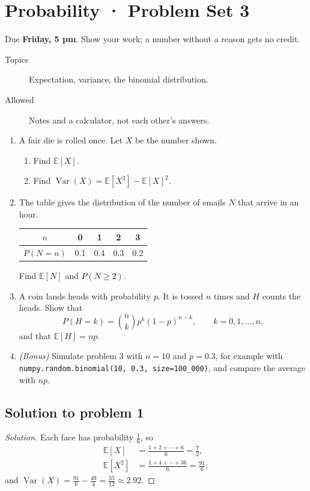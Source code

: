 \section{Probability · Problem Set 3}

Due \textbf{Friday, 5 pm}. Show your work; a number without a reason gets no credit.

\begin{description}
  \item[Topics] Expectation, variance, the binomial distribution.
  \item[Allowed] Notes and a calculator, not each other's answers.
\end{description}

\begin{enumerate}
  \item A fair die is rolled once. Let $X$ be the number shown.
  \begin{enumerate}
    \item Find $\mathbb{E}[X]$.
    \item Find $\operatorname{Var}(X) = \mathbb{E}[X^2] - \mathbb{E}[X]^2$.
  \end{enumerate}

  \item The table gives the distribution of the number of emails $N$ that arrive in an hour.
  \begin{center}
  \begin{tabular}{c|cccc}
    $n$ & 0 & 1 & 2 & 3 \\
    \hline
    $P(N = n)$ & 0.1 & 0.4 & 0.3 & 0.2 \\
  \end{tabular}
  \end{center}
  Find $\mathbb{E}[N]$ and $P(N \geq 2)$.

  \item A coin lands heads with probability $p$. It is tossed $n$ times and $H$ counts the heads. Show that
  \[ P(H = k) = \binom{n}{k} p^k (1 - p)^{n - k}, \qquad k = 0, 1, \ldots, n, \]
  and that $\mathbb{E}[H] = np$.

  \item \emph{(Bonus)} Simulate problem 3 with $n = 10$ and $p = 0.3$, for example with \verb|numpy.random.binomial(10, 0.3, size=100_000)|, and compare the average with $np$.
\end{enumerate}

\subsection*{Solution to problem 1}

\begin{proof}[Solution]
Each face has probability $\frac{1}{6}$, so
\begin{align*}
  \mathbb{E}[X] &= \frac{1 + 2 + \cdots + 6}{6} = \frac{7}{2}, \\
  \mathbb{E}[X^2] &= \frac{1 + 4 + \cdots + 36}{6} = \frac{91}{6},
\end{align*}
and $\operatorname{Var}(X) = \frac{91}{6} - \frac{49}{4} = \frac{35}{12} \approx 2.92$.
\end{proof}
